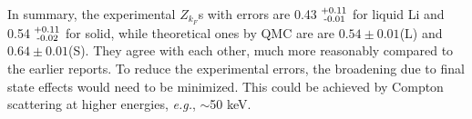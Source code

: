 \documentclass[twocolumn,showpacs,showkeys,fleqn,prl,superscriptaddress]{revtex4}%
\newcommand{\nn}[1]{\textnormal{ #1}}
\begin{document}
\vspace{10mm}

In summary,  the experimental $Z_{k_F}$s with errors are 0.43$^{\nn{+0.11}}_{\nn{\;-0.01}}$ for liquid Li and 0.54$^{\nn{+0.11}}_{\nn{\;-0.02}}$ for solid, while theoretical ones by QMC are are $0.54\pm0.01$(L) and $0.64\pm0.01$(S).
They agree with each other, much more reasonably compared to the earlier reports.
To reduce the experimental errors, the broadening due to final state effects would need to be minimized.
This could be achieved by Compton scattering at higher energies, {\it{e.g.}}, $\sim$50 keV.


%
%
\end{document}
